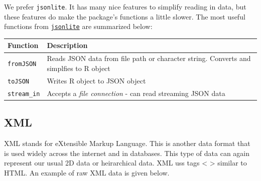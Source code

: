 \documentclass[
]{book}
\theoremstyle{definition}
\theoremstyle{definition}
\theoremstyle{definition}
\theoremstyle{remark}
\begin{document}
We prefer \texttt{jsonlite}. It has many nice features to simplify reading in data, but these features do make the package's functions a little slower. The most useful functions from \href{https://www.rdocumentation.org/packages/jsonlite/versions/1.6}{\texttt{jsonlite}} are summarized below:

\begin{longtable}[]{@{}ll@{}}
\toprule
\begin{minipage}[b]{0.17\columnwidth}\raggedright
Function\strut
\end{minipage} & \begin{minipage}[b]{0.77\columnwidth}\raggedright
Description\strut
\end{minipage}\tabularnewline
\midrule
\endhead
\begin{minipage}[t]{0.17\columnwidth}\raggedright
\texttt{fromJSON}\strut
\end{minipage} & \begin{minipage}[t]{0.77\columnwidth}\raggedright
Reads JSON data from file path or character string. Converts and simplfies to R object\strut
\end{minipage}\tabularnewline
\begin{minipage}[t]{0.17\columnwidth}\raggedright
\texttt{toJSON}\strut
\end{minipage} & \begin{minipage}[t]{0.77\columnwidth}\raggedright
Writes R object to JSON object\strut
\end{minipage}\tabularnewline
\begin{minipage}[t]{0.17\columnwidth}\raggedright
\texttt{stream\_in}\strut
\end{minipage} & \begin{minipage}[t]{0.77\columnwidth}\raggedright
Accepts a \emph{file connection} - can read streaming JSON data\strut
\end{minipage}\tabularnewline
\bottomrule
\end{longtable}

\hypertarget{xml}{%
\subsection{XML}\label{xml}}

XML stands for eXtensible Markup Language. This is another data format that is used widely across the internet and in databases. This type of data can again represent our usual 2D data or heirarchical data. XML uss tags \textless{} \textgreater{} similar to HTML. An example of raw XML data is given below.
\end{document}
